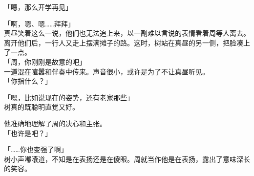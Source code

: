 「嗯，那么开学再见」

「啊，嗯、嗯……拜拜」\\

真昼笑着这么一说，他们也无法追上来，以一副难以言说的表情看着周等人离去。\\

离开他们后，一行人又走上摆满摊子的路。这时，树站在真昼的另一侧，把脸凑上了一点。\\

「周，你刚刚是故意的吧」\\

一道混在喧嚣和伴奏中传来。声音很小，或许是为了不让真昼听见。\\

「你指什么？」

「嗯，比如说现在的姿势，还有老家那些」\\

树真的既聪明直觉又好。

他准确地理解了周的决心和主张。\\

「也许是吧？」

「……你也变强了啊」\\

树小声嘟囔道，不知是在表扬还是在傻眼。周就当作他是在表扬，露出了意味深长的笑容。
